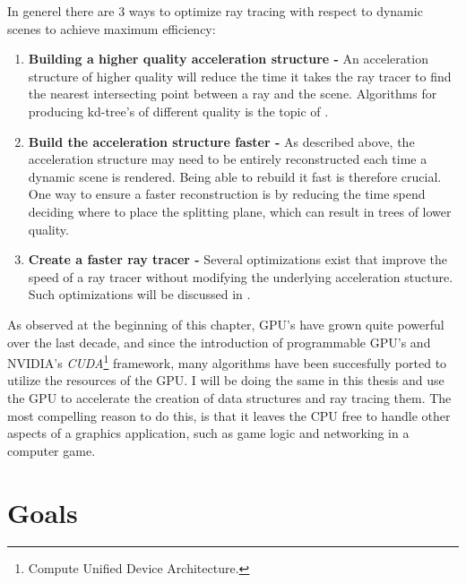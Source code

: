 In generel there are 3 ways to optimize ray tracing with respect to dynamic
scenes to achieve maximum efficiency:

\begin{enumerate}
  \item \textbf{Building a higher quality acceleration structure -} An
    acceleration structure of higher quality will reduce the time it takes the
    ray tracer to find the nearest intersecting point between a ray and the
    scene. Algorithms for producing kd-tree's of different quality is the topic
    of .
  \item \textbf{Build the acceleration structure faster -} As described above,
    the acceleration structure may need to be entirely reconstructed each time a
    dynamic scene is rendered. Being able to rebuild it fast is therefore
    crucial. One way to ensure a faster reconstruction is by reducing the time
    spend deciding where to place the splitting plane, which can result in trees
    of lower quality.
  \item \textbf{Create a faster ray tracer -} Several optimizations exist that
    improve the speed of a ray tracer without modifying the underlying
    acceleration stucture. Such optimizations will be discussed in
    .
\end{enumerate}



As observed at the beginning of this chapter, GPU's have grown quite powerful
over the last decade, and since the introduction of programmable GPU's and
NVIDIA's \textit{CUDA}\footnote{Compute Unified Device Architecture.}
framework, many algorithms have been succesfully ported to utilize the resources
of the GPU. I will be doing the same in this thesis and use the GPU to
accelerate the creation of data structures and ray tracing them. The most
compelling reason to do this, is that it leaves the CPU free to handle other
aspects of a graphics application, such as game logic and networking in a
computer game. 




\section{Goals}

